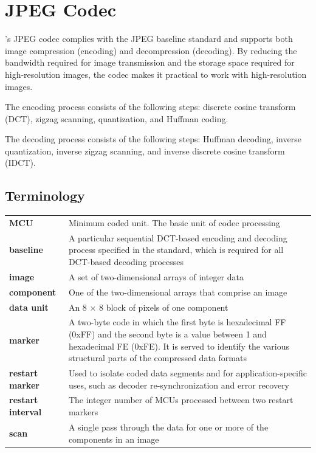 \documentclass[main\_\_EN.tex]{subfiles}
\begin{document}
\setenglishformatting

\ifglobal
\else
    \clearpage
    \listoftodos
    \listofdonetodos
    \tableofcontents
\fi



\hypertarget{jpegcodec}{}
\chapter{JPEG Codec}
\label{mod:jpegcodec}

\chipname{}'s JPEG codec complies with the JPEG baseline standard and supports both image compression (encoding) and decompression (decoding). By reducing the bandwidth required for image transmission and the storage space required for high-resolution images, the codec makes it practical to work with high-resolution images.

The encoding process consists of the following steps: discrete cosine transform (DCT), zigzag scanning, quantization, and Huffman coding.

The decoding process consists of the following steps: Huffman decoding, inverse quantization, inverse zigzag scanning, and inverse discrete cosine transform (IDCT).

\section{Terminology}
\label{sec:jpegcodec-term}
\begin{longtable}[c]{ R{4cm} p{12cm} }
\textbf{MCU} & Minimum coded unit. The basic unit of codec processing \\
\textbf{baseline} & A particular sequential DCT-based encoding and decoding process specified in the standard, which is required for all DCT-based decoding processes \\
\textbf{image} & A set of two-dimensional arrays of integer data \\
\textbf{component} & One of the two-dimensional arrays that comprise an image \\
\textbf{data unit} & An 8 × 8 block of pixels of one component \\
\textbf{marker} & A two-byte code in which the first byte is hexadecimal FF (0xFF) and the second byte is a value between 1 and hexadecimal FE (0xFE). It is served to identify the various structural parts of the compressed data formats \\
\textbf{restart marker} & Used to isolate coded data segments and for application-specific uses, such as decoder re-synchronization and error recovery \\
\textbf{restart interval} & The integer number of MCUs processed between two restart markers \\
\textbf{scan} & A single pass through the data for one or more of the components in an image \\
\end{longtable}
\end{document}

